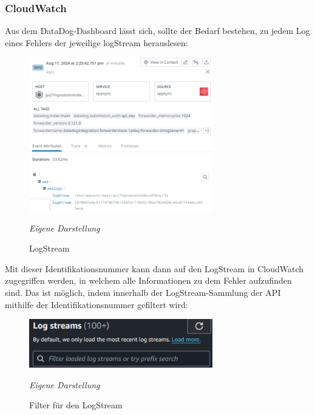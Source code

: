 \subsubsection{CloudWatch}
Aus dem DataDog-Dashboard lässt sich, sollte der Bedarf bestehen, zu jedem Log eines Fehlers der jeweilige logStream herauslesen:\newline

	\begin{figure}[H]
	\centering
	\begin{minipage}[t]{.7\textwidth} %
	\caption{LogStream} %
	
	\includegraphics[width = 8cm,keepaspectratio]{logStream} \newline
	
	\textit{Eigene Darstellung} %
	\label{fig:logStream}
	\end{minipage}
	\end{figure}
 
Mit dieser Identifikationsnummer kann dann auf den LogStream in CloudWatch zugegriffen werden, in welchem alle Informationen zu dem Fehler aufzufinden sind. Das ist möglich, indem innerhalb der LogStream-Sammlung der API mithilfe der Identifikationsnummer gefiltert wird:\newline

	\begin{figure}[H]
	\centering
	\begin{minipage}[t]{.7\textwidth} %
	\caption{Filter für den LogStream} %
	
	\includegraphics[width = 8cm,keepaspectratio]{logStreamFilter} \newline
	
	\textit{Eigene Darstellung} %
	\label{fig:logStreamFilter}
	\end{minipage}
	\end{figure}
 
